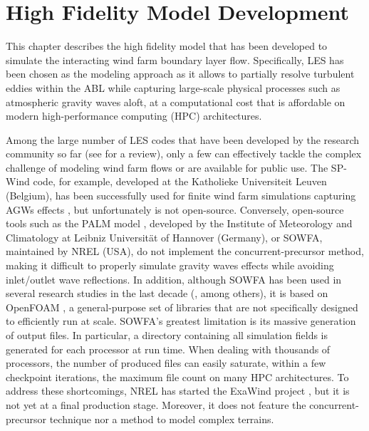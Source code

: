 
\chapter{High Fidelity Model Development}
\label{ch:highFidelityModeling}
This chapter describes the high fidelity model that has been developed to simulate the interacting wind farm boundary layer flow. Specifically, LES has been chosen as the modeling approach as it allows to partially resolve turbulent eddies within the ABL while capturing large-scale physical processes such as atmospheric gravity waves aloft, at a computational cost that is affordable on modern high-performance computing (\acrshort{HPC}) architectures. 

Among the large number of LES codes that have been developed by the research community so far (see \citealp{BretonEtAl2017} for a review), only a few can effectively tackle the complex challenge of modeling wind farm flows or are available for public use. The SP-Wind code, for example, developed at the Katholieke Universiteit Leuven (Belgium), has been successfully used for finite wind farm simulations capturing AGWs effects \citep{LanzilaoMeyers2022b}, but unfortunately is not open-source. Conversely, open-source tools such as the \acrshort{PALM} model \citep{MarongaEtAl2015}, developed by the Institute of Meteorology and Climatology at Leibniz Universität of Hannover (Germany), or \acrshort{SOWFA}, maintained by NREL (USA), do not implement the concurrent-precursor method, making it difficult to properly simulate gravity waves effects while avoiding inlet/outlet wave reflections. In addition, although SOWFA has been used in several research studies in the last decade (\citealp{ChurchfieldEtAl2012a,ChurchfieldEtAl2012b,FlemingEtAl2014, JohlasEtAl2021}, among others), it is based on OpenFOAM \citep{OpenFoam6}, a general-purpose set of libraries that are not specifically designed to efficiently run at scale. SOWFA's greatest limitation is its massive generation of output files. In particular, a directory containing all simulation fields is generated for each processor at run time. When dealing with thousands of processors, the number of produced files can easily saturate, within a few checkpoint iterations, the maximum file count on many HPC architectures. To address these shortcomings, NREL has started the ExaWind project \citep{MinEtAl2022}, but it is not yet at a final production stage. Moreover, it does not feature the concurrent-precursor technique nor a method to model complex terrains.

